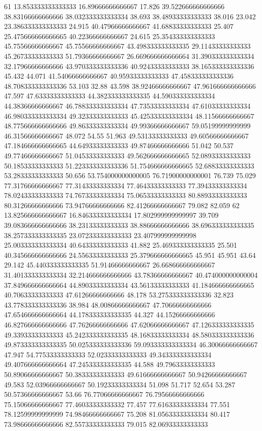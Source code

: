 61 13.853333333333333 16.89666666666667 17.826 39.522666666666666 38.83166666666666 38.032333333333334 38.693 38.48933333333333 38.016 23.042 23.386333333333333 24.915 40.47966666666667 41.68833333333333 25.407 25.475666666666665 40.22366666666667 24.615 25.354333333333333 45.75566666666667 45.75566666666667 43.498333333333335 29.11433333333333 45.26733333333333 51.79366666666667 26.669666666666664 31.390333333333334 32.17966666666666 43.970333333333336 40.92433333333333 38.165333333333336 45.432 44.071 41.54066666666667 40.95933333333333 47.458333333333336 48.708333333333336 53.103 32.88 43.598 38.92466666666667 47.961666666666666 47.597 47.63333333333333 44.382333333333335 44.590333333333334 44.38366666666667 46.788333333333334 47.73533333333334 47.61033333333334 46.980333333333334 49.32333333333333 45.425333333333334 48.11566666666667 48.775666666666666 49.86333333333334 49.99366666666667 59.05199999999999 46.31566666666667 48.072 54.55 51.963 49.53133333333333 49.60566666666667 47.184666666666665 44.64933333333333 49.87466666666666 51.042 50.537 49.77466666666667 51.04533333333333 49.562666666666665 52.08933333333333 50.18533333333333 51.223333333333336 51.754666666666665 52.68833333333333 53.28333333333333 50.656 53.754000000000005 76.71900000000001 76.739 75.029 77.31766666666667 77.31433333333334 77.46433333333333 77.39433333333334 78.02433333333333 74.76733333333334 75.06533333333333 80.88933333333333 80.31266666666666 73.94766666666666 82.41266666666667 79.082 82.059
62 13.825666666666667 16.846333333333334 17.802999999999997 39.709 39.083666666666666 38.23133333333333 38.88666666666666 38.696333333333335 38.257333333333335 23.072333333333333 23.407999999999998 25.003333333333334 40.64333333333333 41.882 25.469333333333335 25.501 40.345666666666666 24.55633333333333 25.379666666666665 45.951 45.951 43.64 29.142 45.440333333333335 51.91466666666667 26.668666666666667 31.401333333333334 32.214666666666666 43.78366666666667 40.474000000000004 37.849666666666664 44.89033333333334 43.56133333333333 41.184666666666665 40.70633333333333 47.61266666666666 48.178 53.275333333333336 32.823 43.778333333333336 38.984 48.00866666666667 47.70666666666666 47.654666666666664 44.178333333333335 44.327 44.15266666666666 46.827666666666666 47.76266666666666 47.62066666666667 47.126333333333335 49.33933333333333 45.242333333333335 48.16833333333334 48.580333333333336 49.873333333333335 50.025333333333336 59.093333333333334 46.30066666666667 47.947 54.77533333333333 52.02333333333333 49.343333333333334 49.407666666666664 47.245333333333335 44.588 49.79633333333333 50.89066666666667 50.38333333333333 49.61666666666667 50.94266666666667 49.583 52.03966666666667 50.19233333333334 51.098 51.717 52.654 53.287 50.57366666666667 53.66 76.77066666666667 76.79566666666666 75.15066666666667 77.46033333333332 77.457 77.61633333333334 77.551 78.12599999999999 74.98466666666667 75.208 81.05633333333334 80.417 73.98666666666666 82.55733333333333 79.015 82.06933333333333
